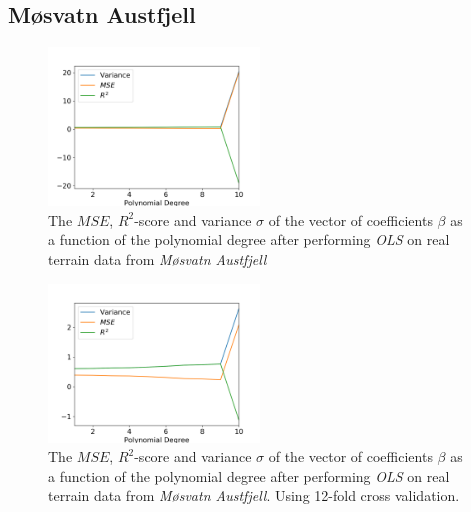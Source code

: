 \documentclass[a4paper,10pt,english]{article}
\begin{document}
\begin{multicols*}{2}

\subsection*{Møsvatn Austfjell}

\begin{figure}[H]
	\centering 
	\includegraphics[width = 0.5\textwidth, center]{../real_output/part_A.png}
	\caption{The $MSE$, $R^2$-score and variance $\sigma$ of the vector of coefficients $\beta$ as a function of the polynomial degree after performing \textit{OLS} on real terrain data from \textit{Møsvatn Austfjell}}
	\label{fig_16}
\end{figure}

\begin{figure}[H]
	\centering 
	\includegraphics[width = 0.5\textwidth, center]{../real_output/part_B.png}
	\caption{The $MSE$, $R^2$-score and variance $\sigma$ of the vector of coefficients $\beta$ as a function of the polynomial degree after performing \textit{OLS} on real terrain data from \textit{Møsvatn Austfjell}. Using 12-fold cross validation.}
	\label{fig_17}
\end{figure}


\end{multicols*}
\end{document}
